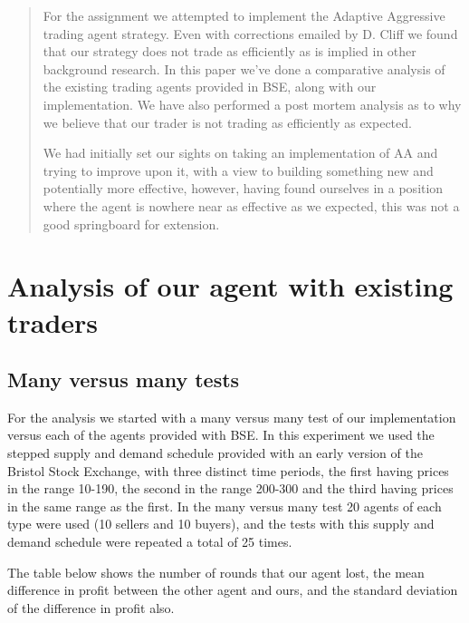 \documentclass{acm_proc_article-sp}
\begin{document}
\maketitle
\begin{abstract}

For the assignment we attempted to implement the Adaptive
Aggressive\cite{Vytellingum:AA} trading agent strategy. Even with corrections
emailed by D. Cliff we found that our strategy does not trade as efficiently as
is implied in other background research\cite{DC:dominate}. In this paper we've
done a comparative analysis of the existing trading agents provided in BSE,
along with our implementation. We have also performed a post mortem analysis as
to why we believe that our trader is not trading as efficiently as expected.

We had initially set our sights on taking an implementation of AA and trying to
improve upon it, with a view to building something new and potentially more
effective, however, having found ourselves in a position where the agent is
nowhere near as effective as we expected, this was not a good springboard for
extension.

\end{abstract}

\section{Analysis of our agent with existing traders}

\subsection {Many versus many tests} For the analysis we started with a many
versus many test of our implementation versus each of the agents provided with
BSE. In this experiment we used the stepped supply and demand schedule provided
with an early version of the Bristol Stock Exchange, with three distinct time
periods, the first having prices in the range 10-190, the second in the range
200-300 and the third having prices in the same range as the first. In the many
versus many test 20 agents of each type were used (10 sellers and 10 buyers),
and the tests with this supply and demand schedule were repeated a total of 25
times.

The table below shows the number of rounds that our agent lost, the mean
difference in profit between the other agent and ours, and the standard
deviation of the difference in profit also.
\end{document}
